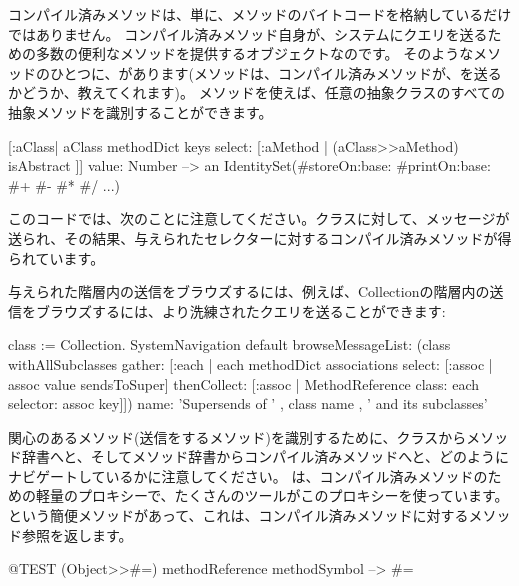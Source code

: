 \documentclass[a4paper,10pt,twoside]{book}
\begin{document}
コンパイル済みメソッドは、単に、メソッドのバイトコードを格納しているだけではありません。
コンパイル済みメソッド自身が、システムにクエリを送るための多数の便利なメソッドを提供するオブジェクトなのです。
そのようなメソッドのひとつに、があります(メソッドは、コンパイル済みメソッドが、を送るかどうか、教えてくれます)。
メソッドを使えば、任意の抽象クラスのすべての抽象メソッドを識別することができます。
\begin{code}{}
[:aClass| aClass methodDict keys select: [:aMethod |
  (aClass>>aMethod) isAbstract ]] value: Number
  --> an IdentitySet(#storeOn:base: #printOn:base: #+ #- #* #/ ...)
\end{code}
このコードでは、次のことに注意してください。クラスに対して、\ct{>>}メッセージが送られ、その結果、与えられたセレクターに対するコンパイル済みメソッドが得られています。


与えられた階層内の\super{}送信をブラウズするには、例えば、Collectionの階層内の\super{}送信をブラウズするには、より洗練されたクエリを送ることができます:
\begin{code}{}
class := Collection.
SystemNavigation default
  browseMessageList: (class withAllSubclasses gather: [:each |
    each methodDict associations
      select: [:assoc | assoc value sendsToSuper]
      thenCollect: [:assoc | MethodReference class: each selector: assoc key]])
  name: 'Supersends of ' , class name , ' and its subclasses'
\end{code}
関心のあるメソッド(\super{}送信をするメソッド)を識別するために、クラスからメソッド辞書へと、そしてメソッド辞書からコンパイル済みメソッドへと、どのようにナビゲートしているかに注意してください。
は、コンパイル済みメソッドのための軽量のプロキシーで、たくさんのツールがこのプロキシーを使っています。
という簡便メソッドがあって、これは、コンパイル済みメソッドに対するメソッド参照を返します。%
\begin{code}{@TEST}
(Object>>#=) methodReference methodSymbol --> #=
\end{code}
\end{document}
